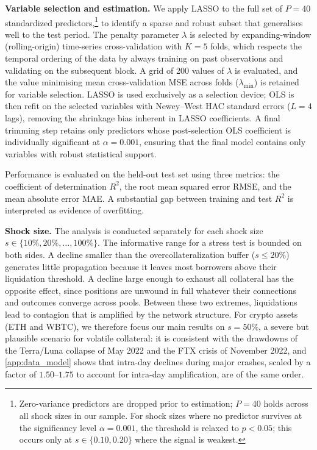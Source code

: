 \documentclass[a4paper,UKenglish,cleveref, autoref, thm-restate]{informs3}
\newcommand{\rev}[1]{{\color{purple}#1}}
\newcommand{\boldpara}[1]{\noindent\textbf{#1}\quad}
\begin{document}
\boldpara{Variable selection and estimation.}
We apply LASSO to the full set of $P = 40$ standardized predictors,\footnote{Zero-variance predictors are dropped prior to estimation; $P = 40$ 
holds across all shock sizes in our sample. For shock sizes where no predictor 
survives at the significancy level $\alpha = 0.001$, the threshold is relaxed to $p < 0.05$; this 
occurs only at $s \in \{0.10, 0.20\}$ where the signal is weakest.} to identify a sparse and robust subset that generalises well to the test period. The penalty parameter $\lambda$ is selected by expanding-window (rolling-origin) time-series cross-validation with $K = 5$ folds, which respects the temporal ordering of the data by always training on past observations and validating on the subsequent block. A grid of 200 values of $\lambda$ is evaluated, and the value minimising mean cross-validation MSE across folds ($\lambda_{\min}$) is 
retained for variable selection. LASSO is used exclusively as a selection device; OLS is then refit on the selected variables with Newey--West HAC standard errors ($L = 4$ lags), removing the shrinkage bias inherent in LASSO coefficients. A final trimming step retains only predictors whose post-selection OLS coefficient is individually significant at
$\alpha = 0.001$, ensuring that the final model contains only variables with robust statistical support.


Performance is evaluated on the held-out test set using three metrics: the coefficient of determination $R^2$, the root mean squared error RMSE, and the mean absolute error MAE. A substantial gap between training and test $R^2$ is interpreted as evidence of overfitting.

\medskip

\boldpara{Shock size.}
The analysis is conducted separately for each shock size
$s \in \{10\%, 20\%, \ldots, 100\%\}$. \rev{The informative range for
a stress test is bounded on both sides. A decline
smaller than the overcollateralization buffer ($s \leq 20\%$)
generates little propagation because it leaves most borrowers above
their liquidation threshold. A decline large
enough to exhaust all collateral has the opposite effect, since positions
are unwound in full whatever their connections and outcomes converge
across pools. Between these two extremes, liquidations
lead to contagion that is amplified by the network structure. For crypto assets (ETH and WBTC), we therefore focus
our main results on $s = 50\%$, a severe but plausible scenario for
volatile collateral: it is consistent with the drawdowns of the Terra/Luna collapse of May
2022 and the FTX crisis of November 2022, and \ref{app:data_model}
shows that intra-day declines during major crashes, scaled by a factor
of $1.50$--$1.75$ to account for intra-day amplification, are of the
same order.}
\end{document}
